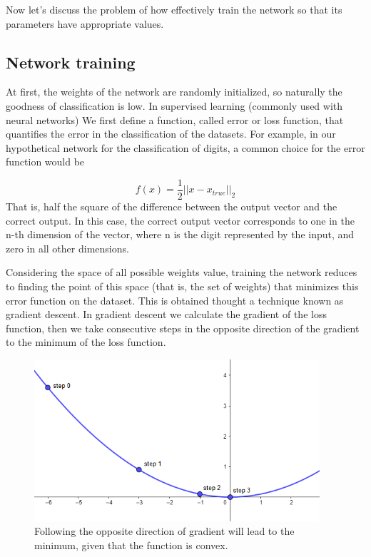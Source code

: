 \documentclass[a4paper]{report}
\begin{document}
Now let's discuss the problem of how effectively train the network so that its parameters have appropriate values.

\subsection{Network training}
At first, the weights of the network are randomly initialized, so naturally the goodness of classification is low.
In supervised learning (commonly used with neural networks) We first define a function, called error or loss function, that quantifies the error in the classification of the datasets.
For example, in our hypothetical network for the classification of digits, a common choice for the error function would be

\begin{equation}
f(x)=\frac{1}{2}||x-x_{true}||_2
\label{true}
\end{equation}
That is, half the square of the difference between the output vector and the correct output.
In this case, the correct output vector corresponds to one in the n-th dimension of the vector, where n is the digit represented by the input, and zero in all other dimensions.

Considering the space of all possible weights value, training the network reduces to finding the point of this space (that is, the set of weights) that minimizes this error function on the dataset.
This is obtained thought a technique known as gradient descent.
In gradient descent we calculate the gradient of the loss function, then we take consecutive steps in the opposite direction of the gradient to the minimum of the loss function.

\begin{figure}[H]
\centering
\includegraphics[height=6cm]{o/gradient.png}
\caption{Following the opposite direction of gradient will lead to the minimum, given that the function is convex.}
\end{figure}
\end{document}
